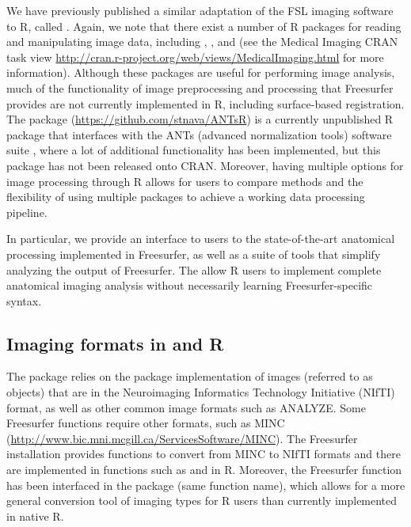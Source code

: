 We have previously published a similar adaptation of the FSL imaging
software \citep{jenkinson_fsl_2012} to R, called 
\citep{muschelli2015fslr}. Again, we note that there exist a number of R
packages for reading and manipulating image data, including
 \citep{bordier_temporal_2011}, 
\citep{modat_rniftyreg:_2013}, and 
\citep{tabelow_statistical_2011} (see the Medical Imaging CRAN task view
\url{http://cran.r-project.org/web/views/MedicalImaging.html} for more
information). Although these packages are useful for performing image
analysis, much of the functionality of image preprocessing and
processing that Freesurfer provides are not currently implemented in R,
including surface-based registration. The  package
(\url{https://github.com/stnava/ANTsR}) is a currently unpublished R
package that interfaces with the ANTs (advanced normalization tools)
software suite \citep{avants_reproducible_2011}, where a lot of
additional functionality has been implemented, but this package has not
been released onto CRAN. Moreover, having multiple options for image
processing through R allows for users to compare methods and the
flexibility of using multiple packages to achieve a working data
processing pipeline.

In particular, we provide an interface to users to the state-of-the-art
anatomical processing implemented in Freesurfer, as well as a suite of
tools that simplify analyzing the output of Freesurfer. The
 allow R users to implement complete anatomical imaging
analysis without necessarily learning Freesurfer-specific syntax.

\subsection{\texorpdfstring{Imaging formats in  and
R}{Imaging formats in  and R}}\label{imaging-formats-in-and-r}

The  package relies on the 
\citep{whitcher_working_2011} package implementation of images (referred
to as  objects) that are in the Neuroimaging Informatics
Technology Initiative (NIfTI) format, as well as other common image
formats such as ANALYZE. Some Freesurfer functions require other
formats, such as MINC
(\url{http://www.bic.mni.mcgill.ca/ServicesSoftware/MINC}). The
Freesurfer installation provides functions to convert from MINC to NIfTI
formats and there are implemented in functions such as 
and  in R. Moreover, the  Freesurfer
function has been interfaced in the  package (same
function name), which allows for a more general conversion tool of
imaging types for R users than currently implemented in native R.

